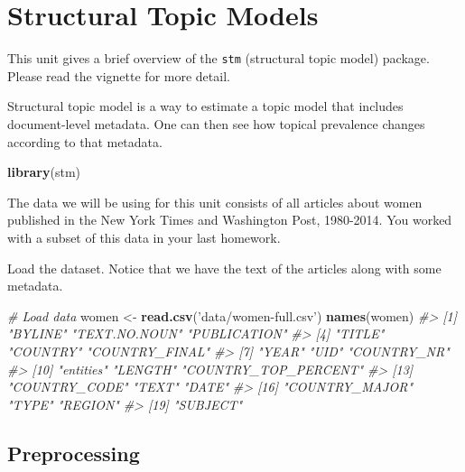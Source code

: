 \documentclass[
]{book}
\newenvironment{Shaded}{\begin{snugshade}}{\end{snugshade}}
\newcommand{\CommentTok}[1]{\textcolor[rgb]{0.56,0.35,0.01}{\textit{#1}}}
\newcommand{\KeywordTok}[1]{\textcolor[rgb]{0.13,0.29,0.53}{\textbf{#1}}}
\newcommand{\NormalTok}[1]{#1}
\newcommand{\StringTok}[1]{\textcolor[rgb]{0.31,0.60,0.02}{#1}}
\begin{document}
\hypertarget{structural-topic-models}{%
\section{Structural Topic Models}\label{structural-topic-models}}

This unit gives a brief overview of the \texttt{stm} (structural topic model) package. Please read the vignette for more detail.

Structural topic model is a way to estimate a topic model that includes document-level metadata. One can then see how topical prevalence changes according to that metadata.

\begin{Shaded}
\begin{Highlighting}[]
\KeywordTok{library}\NormalTok{(stm)}
\end{Highlighting}
\end{Shaded}

The data we will be using for this unit consists of all articles about women published in the New York Times and Washington Post, 1980-2014. You worked with a subset of this data in your last homework.

Load the dataset. Notice that we have the text of the articles along with some metadata.

\begin{Shaded}
\begin{Highlighting}[]
\CommentTok{# Load data}
\NormalTok{women <-}\StringTok{ }\KeywordTok{read.csv}\NormalTok{(}\StringTok{'data/women-full.csv'}\NormalTok{)}
\KeywordTok{names}\NormalTok{(women)}
\CommentTok{#>  [1] "BYLINE"              "TEXT.NO.NOUN"        "PUBLICATION"        }
\CommentTok{#>  [4] "TITLE"               "COUNTRY"             "COUNTRY_FINAL"      }
\CommentTok{#>  [7] "YEAR"                "UID"                 "COUNTRY_NR"         }
\CommentTok{#> [10] "entities"            "LENGTH"              "COUNTRY_TOP_PERCENT"}
\CommentTok{#> [13] "COUNTRY_CODE"        "TEXT"                "DATE"               }
\CommentTok{#> [16] "COUNTRY_MAJOR"       "TYPE"                "REGION"             }
\CommentTok{#> [19] "SUBJECT"}
\end{Highlighting}
\end{Shaded}

\hypertarget{preprocessing-1}{%
\subsection{Preprocessing}\label{preprocessing-1}}
\end{document}
